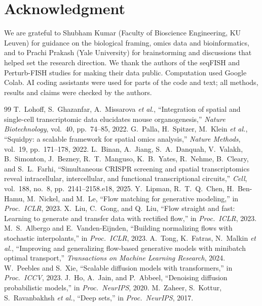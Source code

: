\documentclass[journal]{IEEEtran}
\begin{document}
\section*{Acknowledgment}
We are grateful to Shubham Kumar (Faculty of Bioscience Engineering, KU Leuven) for guidance on the biological framing, omics data and bioinformatics, and to Prachi Prakash (Yale University) for brainstorming and discussions that helped set the research direction. We thank the authors of the seqFISH and Perturb-FISH studies for making their data public. Computation used Google Colab. AI coding assistants were used for parts of the code and text; all methods, results and claims were checked by the authors.

\begin{thebibliography}{99}
 T.~Lohoff, S.~Ghazanfar, A.~Missarova \emph{et al.}, ``Integration of spatial and single-cell transcriptomic data elucidates mouse organogenesis,'' \emph{Nature Biotechnology}, vol.~40, pp.~74--85, 2022.
 G.~Palla, H.~Spitzer, M.~Klein \emph{et al.}, ``Squidpy: a scalable framework for spatial omics analysis,'' \emph{Nature Methods}, vol.~19, pp.~171--178, 2022.
 L.~Binan, A.~Jiang, S.~A.~Danquah, V.~Valakh, B.~Simonton, J.~Bezney, R.~T.~Manguso, K.~B.~Yates, R.~Nehme, B.~Cleary, and S.~L.~Farhi, ``Simultaneous CRISPR screening and spatial transcriptomics reveal intracellular, intercellular, and functional transcriptional circuits,'' \emph{Cell}, vol.~188, no.~8, pp.~2141--2158.e18, 2025.
 Y.~Lipman, R.~T.~Q.~Chen, H.~Ben-Hamu, M.~Nickel, and M.~Le, ``Flow matching for generative modeling,'' in \emph{Proc.\ ICLR}, 2023.
 X.~Liu, C.~Gong, and Q.~Liu, ``Flow straight and fast: Learning to generate and transfer data with rectified flow,'' in \emph{Proc.\ ICLR}, 2023.
 M.~S.~Albergo and E.~Vanden-Eijnden, ``Building normalizing flows with stochastic interpolants,'' in \emph{Proc.\ ICLR}, 2023.
 A.~Tong, K.~Fatras, N.~Malkin \emph{et al.}, ``Improving and generalizing flow-based generative models with minibatch optimal transport,'' \emph{Transactions on Machine Learning Research}, 2024.
 W.~Peebles and S.~Xie, ``Scalable diffusion models with transformers,'' in \emph{Proc.\ ICCV}, 2023.
 J.~Ho, A.~Jain, and P.~Abbeel, ``Denoising diffusion probabilistic models,'' in \emph{Proc.\ NeurIPS}, 2020.
 M.~Zaheer, S.~Kottur, S.~Ravanbakhsh \emph{et al.}, ``Deep sets,'' in \emph{Proc.\ NeurIPS}, 2017.

\end{thebibliography}
\end{document}
